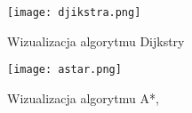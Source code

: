 \begin{figure}
\label{fig:djikstra}
\centering
\texttt{[image: djikstra.png]}
\caption{Wizualizacja algorytmu Dijkstry \cite{searchpathsimplementations}}
\end{figure}

\begin{figure}
\label{fig:astar}
\centering
\texttt{[image: astar.png]}
\caption{Wizualizacja algorytmu A*, \cite{searchpathsimplementations}}
\end{figure}